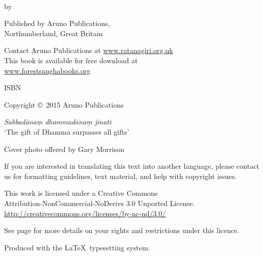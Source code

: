 \cleartoverso
\thispagestyle{empty}
{\copyrightsize\setlength{\parskip}{0.5\baselineskip}\setlength{\parindent}{0em}%
\raggedright%
\shaker\color[gray]{0.3}

\thetitle\\
by \theauthor

Published by Aruno Publications,\\
Northumberland, Great Britain

Contact Aruno Publications at \href{http://ratanagiri.org.uk/}{www.ratanagiri.org.uk}\\
This book is available for free download at\\
\href{http://forestsanghabooks.org/}{www.forestsanghabooks.org}

ISBN \theISBN

Copyright \copyright\ 2015 Aruno Publications

\textit{Sabbadānaṃ dhammadānaṃ jinati}\\
`The gift of Dhamma surpasses all gifts'

Cover photo offered by Gary Morrison

{\tiny
If you are interested in translating this text into another language, please contact us for formatting guidelines, text material, and help with copyright issues.

This work is licensed under a Creative Commons\\
Attribution-NonCommercial-NoDerivs 3.0 Unported License.\\
\href{http://creativecommons.org/licenses/by-nc-nd/3.0/}{http://creativecommons.org/licenses/by-nc-nd/3.0/}

See page \pageref{copyright-details} for more details on your rights and restrictions under this licence.

Produced with the \LaTeX\ typesetting system.

\theEditionInfo

}
}

